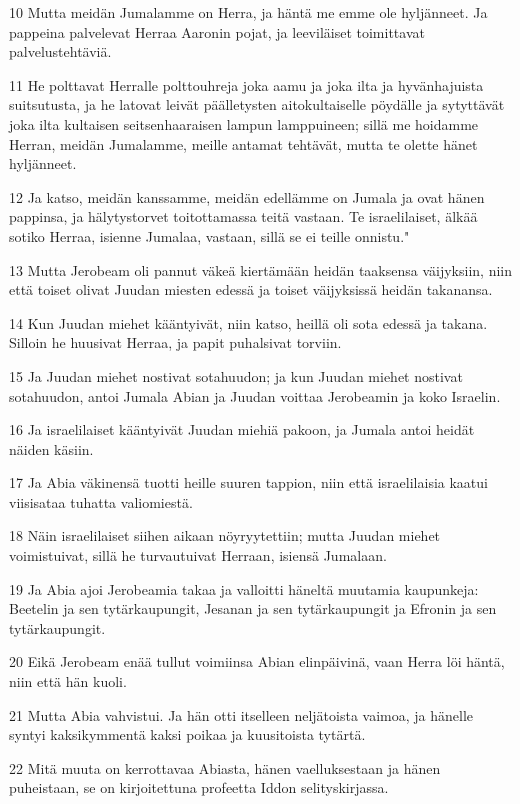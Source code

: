\par 10 Mutta meidän Jumalamme on Herra, ja häntä me emme ole hyljänneet. Ja pappeina palvelevat Herraa Aaronin pojat, ja leeviläiset toimittavat palvelustehtäviä.
\par 11 He polttavat Herralle polttouhreja joka aamu ja joka ilta ja hyvänhajuista suitsutusta, ja he latovat leivät päälletysten aitokultaiselle pöydälle ja sytyttävät joka ilta kultaisen seitsenhaaraisen lampun lamppuineen; sillä me hoidamme Herran, meidän Jumalamme, meille antamat tehtävät, mutta te olette hänet hyljänneet.
\par 12 Ja katso, meidän kanssamme, meidän edellämme on Jumala ja ovat hänen pappinsa, ja hälytystorvet toitottamassa teitä vastaan. Te israelilaiset, älkää sotiko Herraa, isienne Jumalaa, vastaan, sillä se ei teille onnistu."
\par 13 Mutta Jerobeam oli pannut väkeä kiertämään heidän taaksensa väijyksiin, niin että toiset olivat Juudan miesten edessä ja toiset väijyksissä heidän takanansa.
\par 14 Kun Juudan miehet kääntyivät, niin katso, heillä oli sota edessä ja takana. Silloin he huusivat Herraa, ja papit puhalsivat torviin.
\par 15 Ja Juudan miehet nostivat sotahuudon; ja kun Juudan miehet nostivat sotahuudon, antoi Jumala Abian ja Juudan voittaa Jerobeamin ja koko Israelin.
\par 16 Ja israelilaiset kääntyivät Juudan miehiä pakoon, ja Jumala antoi heidät näiden käsiin.
\par 17 Ja Abia väkinensä tuotti heille suuren tappion, niin että israelilaisia kaatui viisisataa tuhatta valiomiestä.
\par 18 Näin israelilaiset siihen aikaan nöyryytettiin; mutta Juudan miehet voimistuivat, sillä he turvautuivat Herraan, isiensä Jumalaan.
\par 19 Ja Abia ajoi Jerobeamia takaa ja valloitti häneltä muutamia kaupunkeja: Beetelin ja sen tytärkaupungit, Jesanan ja sen tytärkaupungit ja Efronin ja sen tytärkaupungit.
\par 20 Eikä Jerobeam enää tullut voimiinsa Abian elinpäivinä, vaan Herra löi häntä, niin että hän kuoli.
\par 21 Mutta Abia vahvistui. Ja hän otti itselleen neljätoista vaimoa, ja hänelle syntyi kaksikymmentä kaksi poikaa ja kuusitoista tytärtä.
\par 22 Mitä muuta on kerrottavaa Abiasta, hänen vaelluksestaan ja hänen puheistaan, se on kirjoitettuna profeetta Iddon selityskirjassa.

